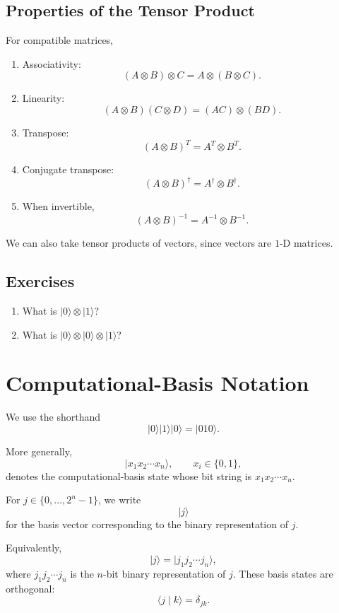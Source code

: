 \documentclass[11pt]{article}
\newcommand{\ket}[1]{\lvert #1\rangle}
\newcommand{\braket}[2]{\langle #1\mid #2\rangle}
\begin{document}
\subsection{Properties of the Tensor Product}

For compatible matrices,
\begin{enumerate}
  \item Associativity:
  \[
    (A\otimes B)\otimes C
    =
    A\otimes(B\otimes C).
  \]
  \item Linearity:
  \[
    (A\otimes B)(C\otimes D)
    =
    (AC)\otimes(BD).
  \]
  \item Transpose:
  \[
    (A\otimes B)^T=A^T\otimes B^T.
  \]
  \item Conjugate transpose:
  \[
    (A\otimes B)^\dagger
    =
    A^\dagger\otimes B^\dagger.
  \]
  \item When invertible,
  \[
    (A\otimes B)^{-1}
    =
    A^{-1}\otimes B^{-1}.
  \]
\end{enumerate}

We can also take tensor products of vectors, since vectors are $1$-D matrices.

\subsection{Exercises}

\begin{enumerate}
  \item What is $\ket{0}\otimes\ket{1}$?
  \item What is $\ket{0}\otimes\ket{0}\otimes\ket{1}$?
\end{enumerate}

\section{Computational-Basis Notation}

We use the shorthand
\[
  \ket{0}\ket{1}\ket{0}
  =
  \ket{010}.
\]

More generally,
\[
  \ket{x_1x_2\cdots x_n},
  \qquad x_i\in\{0,1\},
\]
denotes the computational-basis state whose bit string is
$x_1x_2\cdots x_n$.

For $j\in\{0,\ldots,2^n-1\}$, we write
\[
  \ket{j}
\]
for the basis vector corresponding to the binary representation of $j$.

Equivalently,
\[
  \ket{j}
  =
  \ket{j_1j_2\cdots j_n},
\]
where $j_1j_2\cdots j_n$ is the $n$-bit binary representation of $j$.
These basis states are orthogonal:
\[
  \braket{j}{k}=\delta_{jk}.
\]
\end{document}
